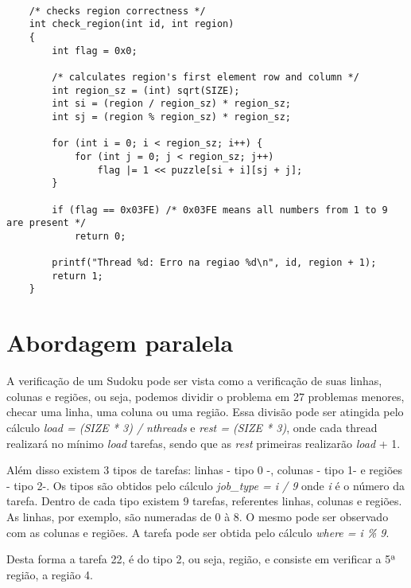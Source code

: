 \documentclass[a4paper, 12pt]{article}
\begin{document}
\newpage

\begin{verbatim}

    /* checks region correctness */
    int check_region(int id, int region)
    {
        int flag = 0x0;

        /* calculates region's first element row and column */
        int region_sz = (int) sqrt(SIZE);
        int si = (region / region_sz) * region_sz;
        int sj = (region % region_sz) * region_sz;

        for (int i = 0; i < region_sz; i++) {
            for (int j = 0; j < region_sz; j++)
                flag |= 1 << puzzle[si + i][sj + j];
        }

        if (flag == 0x03FE) /* 0x03FE means all numbers from 1 to 9 are present */
            return 0;

        printf("Thread %d: Erro na regiao %d\n", id, region + 1);
        return 1;
    }

\end{verbatim}


\section{Abordagem paralela}
A verificação de um Sudoku pode ser vista como a verificação de suas linhas,
colunas e regiões, ou seja, podemos dividir o problema em 27 problemas menores,
checar uma linha, uma coluna ou uma região.
Essa divisão pode ser atingida pelo cálculo \textit{load = (SIZE * 3) / nthreads} e
\textit{rest = (SIZE * 3)}, onde cada thread realizará no mínimo \textit{load}
tarefas, sendo que as \textit{rest} primeiras realizarão \textit{load} + 1.
\par
Além disso existem 3 tipos de tarefas: linhas - tipo 0 -, colunas - tipo 1-  e
regiões - tipo 2-. Os tipos são obtidos pelo cálculo \textit{job\_type = i / 9}
onde \textit{i} é o número da tarefa. Dentro de cada tipo existem 9 tarefas,
referentes linhas, colunas e regiões. As linhas, por exemplo, são numeradas de
0 à 8. O mesmo pode ser observado com as colunas e regiões. A tarefa pode ser
obtida pelo cálculo \textit{where = i \% 9}.
\par
Desta forma a tarefa 22, é do tipo 2, ou seja, região, e consiste em verificar
a 5ª região, a região 4.


\newpage
\end{document}
